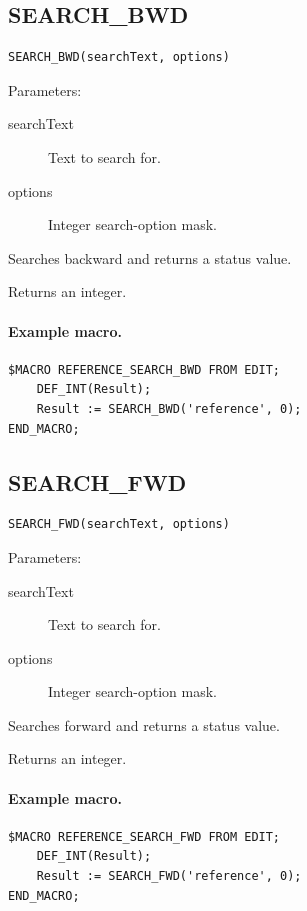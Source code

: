 \documentclass[a4paper,10pt,twoside,openany]{book}
\begin{document}
\label{prim:intrinsic-search-bwd}
\subsection*{SEARCH\_BWD}
\begin{verbatim}
SEARCH_BWD(searchText, options)
\end{verbatim}
Parameters:
\begin{description}
\item[searchText] Text to search for.
\item[options] Integer search-option mask.
\end{description}

Searches backward and returns a status value.

Returns an integer.

\paragraph{Example macro.}
\begin{verbatim}
$MACRO REFERENCE_SEARCH_BWD FROM EDIT;
    DEF_INT(Result);
    Result := SEARCH_BWD('reference', 0);
END_MACRO;
\end{verbatim}

\label{prim:intrinsic-search-fwd}
\subsection*{SEARCH\_FWD}
\begin{verbatim}
SEARCH_FWD(searchText, options)
\end{verbatim}
Parameters:
\begin{description}
\item[searchText] Text to search for.
\item[options] Integer search-option mask.
\end{description}

Searches forward and returns a status value.

Returns an integer.

\paragraph{Example macro.}
\begin{verbatim}
$MACRO REFERENCE_SEARCH_FWD FROM EDIT;
    DEF_INT(Result);
    Result := SEARCH_FWD('reference', 0);
END_MACRO;
\end{verbatim}
\end{document}

